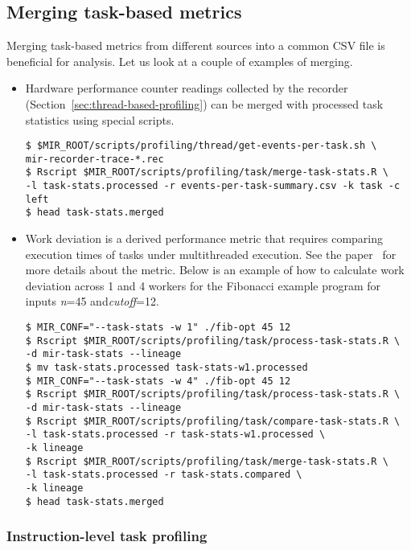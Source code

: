 \documentclass[11pt,a4paper]{article}
\begin{document}
\subsection{Merging task-based metrics}
\label{sub:merging_task_based_metrics}

Merging task-based metrics from different sources into a common CSV file is beneficial for analysis. Let us look at a couple of examples of merging.

\begin{itemize}
    \item Hardware performance counter readings collected by the recorder (Section~\ref{sec:thread-based-profiling}) can be merged with processed task statistics using special scripts.

\begin{lstlisting}[style=MyInputStyle]
$ $MIR_ROOT/scripts/profiling/thread/get-events-per-task.sh \
mir-recorder-trace-*.rec
$ Rscript $MIR_ROOT/scripts/profiling/task/merge-task-stats.R \
-l task-stats.processed -r events-per-task-summary.csv -k task -c left
$ head task-stats.merged
\end{lstlisting}

    \item Work deviation is a derived performance metric that requires comparing execution times of tasks under multithreaded execution. See the paper~\cite{muddukrishna2015grain} for more details about the metric. Below is an example of how to calculate work deviation across 1 and 4 workers for the Fibonacci example program for inputs \textit{n}=45 and\textit{cutoff}=12.

\begin{lstlisting}[style=MyInputStyle]
$ MIR_CONF="--task-stats -w 1" ./fib-opt 45 12
$ Rscript $MIR_ROOT/scripts/profiling/task/process-task-stats.R \
-d mir-task-stats --lineage
$ mv task-stats.processed task-stats-w1.processed
$ MIR_CONF="--task-stats -w 4" ./fib-opt 45 12
$ Rscript $MIR_ROOT/scripts/profiling/task/process-task-stats.R \
-d mir-task-stats --lineage
$ Rscript $MIR_ROOT/scripts/profiling/task/compare-task-stats.R \
-l task-stats.processed -r task-stats-w1.processed \
-k lineage
$ Rscript $MIR_ROOT/scripts/profiling/task/merge-task-stats.R \
-l task-stats.processed -r task-stats.compared \
-k lineage
$ head task-stats.merged
\end{lstlisting}
\end{itemize}

\subsubsection{Instruction-level task profiling}\label{sec:instruction-level-task-profiling}
\end{document}
